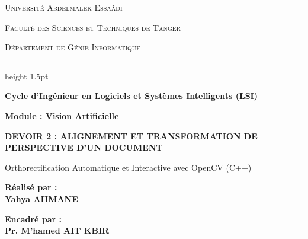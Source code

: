 \documentclass[a4paper,11pt]{article}
\begin{document}
\begin{titlepage}
    \centering
    \vspace*{0.5cm}
    
    {\scshape\Large Université Abdelmalek Essaâdi \par}
    {\scshape\large Faculté des Sciences et Techniques de Tanger \par}
    {\scshape\footnotesize Département de Génie Informatique \par}
    
    \vspace{0.8cm}
    \hrule height 1.5pt
    \vspace{0.8cm}
    
    {\large\bfseries Cycle d'Ingénieur en Logiciels et Systèmes Intelligents (LSI) \par}
    \vspace{0.3cm}
    {\large\color{secondary}\textbf{Module : Vision Artificielle } \par}
    
    \vspace{2.0cm}
    
    \begin{tcolorbox}[colback=primary!5!white,colframe=primary,arc=3mm,boxrule=1.2pt]
        \centering
        \vspace{0.3cm}
        {\LARGE\bfseries\color{primary} DEVOIR 2 : ALIGNEMENT ET TRANSFORMATION DE PERSPECTIVE D'UN DOCUMENT \par}
        \vspace{0.3cm}
        {\large Orthorectification Automatique et Interactive avec OpenCV (C++) \par}
        \vspace{0.2cm}
    \end{tcolorbox}
    
    \vspace{2.5cm}
    
    \begin{minipage}[t]{0.48\textwidth}
        \textbf{\large Réalisé par :}\\[0.2cm]
        {\Large\textbf{Yahya AHMANE}}\\[0.1cm]
    \end{minipage}
    \hfill
    \begin{minipage}[t]{0.48\textwidth}
        \begin{flushright}
            \textbf{\large Encadré par :}\\[0.2cm]
            {\Large\textbf{Pr. M'hamed AIT KBIR}}\\[0.1cm]
        \end{flushright}
    \end{minipage}
    

\end{titlepage}
\end{document}
